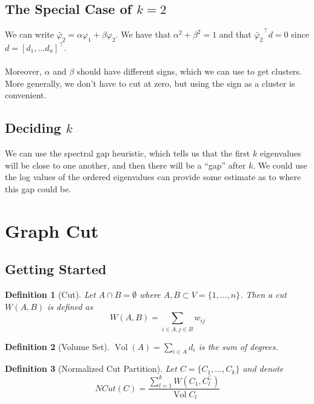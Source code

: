 \documentclass[12pt]{article}
\theoremstyle{plain}
\newtheorem*{definition}{Definition}
\DeclareMathOperator*{\vol}{Vol}
\begin{document}
\subsection{The Special Case of $ k = 2$}

We can write $ \widetilde{\varphi_2} = \alpha \varphi_{1}  + \beta \varphi_{2} $.
We have that $ \alpha^2 + \beta^2 = 1 $ and that $ \widetilde{\varphi_2}^{\intercal}d = 0 $ since $ d = [d_1, \ldots d_n]^{\intercal} $.
\\ \\
Moreover, $ \alpha $ and $ \beta $ should have different signs, which we can use to get clusters.
More generally, we don't have to cut at zero, but using the sign as a cluster is convenient.

\subsection{Deciding $ k $}

We can use the spectral gap heuristic, which tells us that the first $ k $ eigenvalues will be close to one another, and then there will be a ``gap'' after $ k $.
We could use the log values of the ordered eigenvalues can provide some estimate as to where this gap could be.

\section{Graph Cut}

\subsection{Getting Started}

\begin{definition}[Cut]

Let $ A \cap B = \emptyset $ where $ A, B \subset V = \{ 1, \ldots, n \} $.
Then a cut $ W(A, B) $ is defined as
\[
W(A, B) = \sum_{i \in A, j \in B} w_{ij}
\]

\end{definition}

\begin{definition}[Volume Set]

$ \vol(A) = \sum_{i \in A} d_i $ is the sum of degrees.

\end{definition}

\begin{definition}[Normalized Cut Partition]
Let $ C = \{ C_1, \ldots, C_k \} $ and denote
\[
NCut(C) = \frac{ \sum_{l = 1}^k W(C_1, C_l^{\complement}) }{ \vol{C_l} }
\]

\end{definition}
\end{document}
